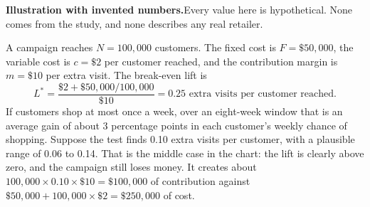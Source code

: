 \documentclass[11pt]{article}
\begin{document}
\vspace{4pt}
\begin{center}
\end{center}

\vspace{2pt}
\begin{hypo}
{\bfseries Illustration with invented numbers.}\enspace Every value here is hypothetical. None
comes from the study, and none describes any real retailer.

A campaign reaches $N = 100{,}000$ customers. The fixed cost is $F = \$50{,}000$, the variable
cost is $c = \$2$ per customer reached, and the contribution margin is $m = \$10$ per extra
visit. The break-even lift is
\[ L^{*} = \frac{\$2 + \$50{,}000 / 100{,}000}{\$10} = 0.25 \text{ extra visits per customer reached.} \]
If customers shop at most once a week, over an eight-week window that is an average gain of
about 3 percentage points in each customer's weekly chance of shopping. Suppose the test finds
0.10 extra visits per customer, with a plausible range of 0.06 to 0.14. That is the middle case
in the chart: the lift is clearly above zero, and the campaign still loses money. It creates about
$100{,}000 \times 0.10 \times \$10 = \$100{,}000$ of contribution against
$\$50{,}000 + 100{,}000 \times \$2 = \$250{,}000$ of cost.
\end{hypo}
\end{document}

